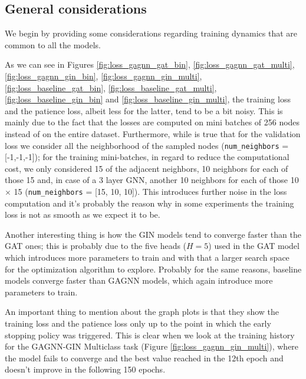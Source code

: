 \subsection{General considerations}
We begin by providing some considerations regarding training dynamics that are common to all the models.

As we can see in Figures \ref{fig:loss_gagnn_gat_bin}, \ref{fig:loss_gagnn_gat_multi}, \ref{fig:loss_gagnn_gin_bin}, \ref{fig:loss_gagnn_gin_multi}, \ref{fig:loss_baseline_gat_bin}, \ref{fig:loss_baseline_gat_multi}, \ref{fig:loss_baseline_gin_bin} and \ref{fig:loss_baseline_gin_multi}, the training loss and the patience loss, albeit less for the latter, tend to be a bit noisy. This is mainly due to the fact that the losses are computed on mini batches of 256 nodes instead of on the entire dataset. Furthermore, while is true that for the validation loss we consider all the neighborhood of the sampled nodes (\texttt{num\_neighbors} = [-1,-1,-1]); for the training mini-batches, in regard to reduce the computational cost, we only considered 15 of the adjacent neighbors, 10 neighbors for each of those 15 and, in case of a 3 layer GNN, another 10 neighbors for each of those 10 \(\times\) 15 (\texttt{num\_neighbors} = [15, 10, 10]). This introduces further noise in the loss computation and it's probably the reason why in some experiments the training loss is not as smooth as we expect it to be. 

Another interesting thing is how the GIN models tend to converge faster than the GAT ones; this is probably due to the five heads (\(H=5\)) used in the GAT model which introduces more parameters to train and with that a larger search space for the optimization algorithm to explore. Probably for the same reasons, baseline models converge faster than GAGNN models, which again introduce more parameters to train. 

An important thing to mention about the graph plots is that they show the training loss and the patience loss only up to the point in which the early stopping policy was triggered. This is clear when we look at the training history for the GAGNN-GIN Multiclass task (Figure \ref{fig:loss_gagnn_gin_multi}), where the model fails to converge and the best value reached in the 12th epoch and doesn't improve in the following 150 epochs. 

